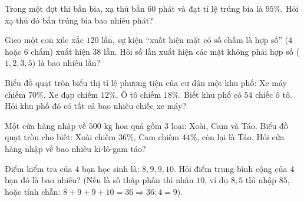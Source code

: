\begin{ex} %
Trong một đợt thi bắn bia, xạ thủ bắn $60$ phát và đạt tỉ lệ trúng bia là $95\%$. Hỏi xạ thủ đó bắn trúng bia bao nhiêu phát?
\end{ex}

\begin{ex} %
Gieo một con xúc xắc $120$ lần, sự kiện “xuất hiện mặt có số chấm là hợp số” ($4$ hoặc $6$ chấm) xuất hiện $38$ lần. Hỏi số lần xuất hiện các mặt không phải hợp số ($1, 2, 3, 5$) là bao nhiêu lần?
\end{ex}

\begin{ex} %
Biểu đồ quạt tròn biểu thị tỉ lệ phương tiện của cư dân một khu phố: Xe máy chiếm $70\%$, Xe đạp chiếm $12\%$, Ô tô chiếm $18\%$. Biết khu phố có $54$ chiếc ô tô. Hỏi khu phố đó có tất cả bao nhiêu chiếc xe máy?
\end{ex}

\begin{ex} %
Một cửa hàng nhập về $500\text{ kg}$ hoa quả gồm $3$ loại: Xoài, Cam và Táo. Biểu đồ quạt tròn cho biết: Xoài chiếm $36\%$, Cam chiếm $44\%$, còn lại là Táo. Hỏi cửa hàng nhập về bao nhiêu ki-lô-gam táo?
\end{ex}

\begin{ex} %
Điểm kiểm tra của $4$ bạn học sinh là: $8, 9, 9, 10$. Hỏi điểm trung bình cộng của $4$ bạn đó là bao nhiêu? (Nếu là số thập phân thì nhân $10$, ví dụ $8{,}5$ thì nhập $85$, hoặc tính chẵn: $8+9+9+10 = 36 \Rightarrow 36 : 4 = 9$).
\end{ex}
